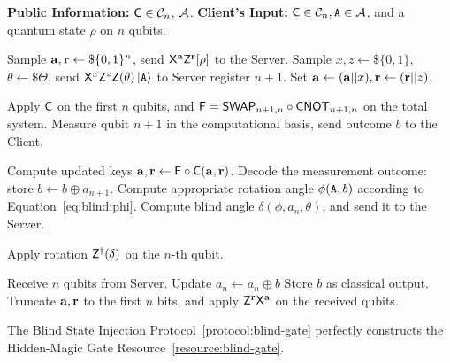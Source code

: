 \begin{protocoll}
    \caption{Blind State Injection}
    \label{protocol:blind-gate}
    \begin{algorithmic}[1]
        \State \textbf{Public Information:} $\mathsf{C}\in\mathcal{C}_n$, $\mathcal A$.
        \State \textbf{Client's Input:} $\mathsf{C}\in\mathcal{C}_n, \mathtt{A}\in\mathcal A$, and a quantum state $\rho$ on $n$ qubits.

        \State Sample $\mathbf a, \mathbf r \gets\$\{0,1\}^n$, send $\mathsf{X}^{\mathbf a}\mathsf{Z}^{\mathbf r}[\rho]$ to the Server.
        \State Sample $x, z \gets\$\{0,1\}$, $\theta\gets\$\Theta$, send $\mathsf{X}^{x}\mathsf{Z}^{z}\mathsf{Z}(\theta)\ket{\mathtt{A}}$ to Server register $n+1$.
        \State Set $\mathbf a \gets (\mathbf a ||x), \mathbf r\gets (\mathbf r||z)$. 
        \EndProcedure

        \State Apply $\mathsf{C}$ on the first $n$ qubits, and $\mathsf{F}=\mathsf{SWAP}_{n+1, n}\circ \mathsf{CNOT}_{n+1, n}$ on the total system.
        \State Measure qubit $n+1$ in the computational basis, send outcome $b$ to the Client.
        \EndProcedure

        \State Compute updated keys $\mathbf a,\mathbf r \gets \mathsf{F}\circ\mathsf{C}(\mathbf a,\mathbf r)$.
        \State Decode the measurement outcome: store $b\gets b\oplus a_{n+1}$.
        \State Compute appropriate rotation angle $\phi(\mathtt{A}, b)$ according to Equation~\ref{eq:blind:phi}.
        \State Compute blind angle $\delta(\phi, a_n, \theta)$, and send it to the Server.
        \label{protocolstep:blind angle}
        \EndProcedure

        \State Apply rotation $\mathsf{Z}^\dagger(\delta)$ on the $n$-th qubit.
        \EndProcedure

        \State Receive $n$ qubits from Server.
        \If{$\Alabel=\Tlabel$}
            \State Update $a_n\gets a_n\oplus b$ 
        \Else
            \State Store $b$ as classical output.
        \EndIf
        \State Truncate $\mathbf a, \mathbf r$ to the first $n$ bits, and apply $\mathsf{Z}^{\mathbf r}\mathsf{X}^{\mathbf a}$ on the received qubits.
        \EndProcedure

    \end{algorithmic}
\end{protocoll}

\begin{theorem}
\label{thm:blind-gate}
The Blind State Injection Protocol~\ref{protocol:blind-gate} perfectly constructs the Hidden-Magic Gate Resource~\ref{resource:blind-gate}.
\end{theorem}

